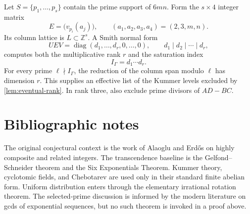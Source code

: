 \documentclass[11pt,oneside]{article}
\theoremstyle{definition}
\theoremstyle{remark}
\newcommand{\Z}{\mathbb{Z}}
\begin{document}
Let $S=\{p_1,\ldots,p_s\}$ contain the prime support of $6mn$.  Form the
$s\times4$ integer matrix
\[
 E=\bigl(v_{p_i}(a_j)\bigr),
 \qquad (a_1,a_2,a_3,a_4)=(2,3,m,n).
\]
Its column lattice is $L\subset\Z^s$.  A Smith normal form
\[
 UEV=\operatorname{diag}(d_1,\ldots,d_r,0,\ldots,0),
 \qquad d_1\mid d_2\mid\cdots\mid d_r,
\]
computes both the multiplicative rank $r$ and the saturation index
\[
 I_\Gamma=d_1\cdots d_r.
\]
For every prime $\ell\nmid I_\Gamma$, the reduction of the column span modulo
$\ell$ has dimension $r$.  This supplies an effective list of the Kummer
levels excluded by \cref{lem:eventual-rank}.  In rank three, also exclude
prime divisors of $AD-BC$.

\section{Bibliographic notes}

The original conjectural context is the work of Alaoglu and Erd\H{o}s on
highly composite and related integers.  The transcendence baseline is the
Gelfond--Schneider theorem and the Six Exponentials Theorem.  Kummer theory,
cyclotomic fields, and Chebotarev are used only in their standard finite
abelian form.  Uniform distribution enters through the elementary irrational
rotation theorem.  The selected-prime discussion is informed by the modern
literature on gcds of exponential sequences, but no such theorem is invoked
in a proof above.
\end{document}
